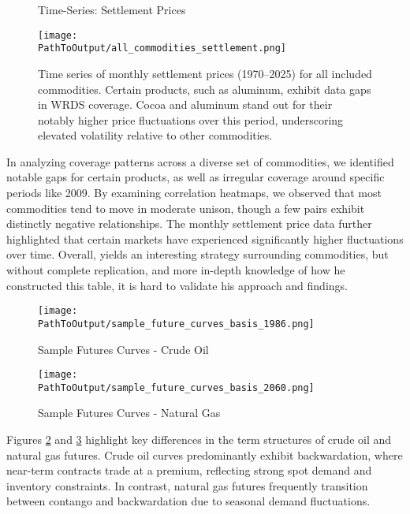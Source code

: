 \documentclass[12pt]{article}
\begin{document}
\clearpage
\begin{figure}[ht!]
  \centering
  \caption{Time-Series: Settlement Prices}
  \begin{adjustbox}{max width=\textwidth}
  \texttt{[image: \\PathToOutput/all\_commodities\_settlement.png]}
  \end{adjustbox}
  \caption*{Time series of monthly settlement prices (1970–2025) for all included commodities. 
  Certain products, such as aluminum, exhibit data gaps in WRDS coverage. Cocoa and aluminum 
  stand out for their notably higher price fluctuations over this period, underscoring elevated 
  volatility relative to other commodities.}
  \label{fig:all_commodities_settlement}
\end{figure}  

\FloatBarrier

In analyzing coverage patterns across a diverse set of commodities, we identified notable gaps 
for certain products, as well as irregular coverage around specific periods like 2009. By examining 
correlation heatmaps, we observed that most commodities tend to move in moderate unison, though a few pairs 
exhibit distinctly negative relationships. The monthly settlement price data further highlighted that certain 
markets have experienced significantly higher fluctuations over time. Overall, \cite{Yang2013} yields an interesting 
strategy surrounding commodities, but without complete replication, and more in-depth knowledge of how he constructed
this table, it is hard to validate his approach and findings. 

\begin{figure}[ht!]
  \centering
  \caption{Sample Futures Curves - Crude Oil}
  \begin{adjustbox}{max width=\textwidth}
  \texttt{[image: \\PathToOutput/sample\_future\_curves\_basis\_1986.png]}
  \end{adjustbox}
  \label{fig:crude_futures}
\end{figure}

\begin{figure}[ht!]
  \centering
  \caption{Sample Futures Curves - Natural Gas}
  \begin{adjustbox}{max width=\textwidth}
  \texttt{[image: \\PathToOutput/sample\_future\_curves\_basis\_2060.png]}
  \end{adjustbox}
  \label{fig:natgas_futures}
\end{figure}

\clearpage
Figures \ref{fig:crude_futures} and \ref{fig:natgas_futures} highlight key differences in the term structures of crude oil and natural gas futures. Crude oil curves predominantly exhibit backwardation, where near-term contracts trade at a premium, reflecting strong spot demand and inventory constraints. In contrast, natural gas futures frequently transition between contango and backwardation due to seasonal demand fluctuations.
\end{document}
